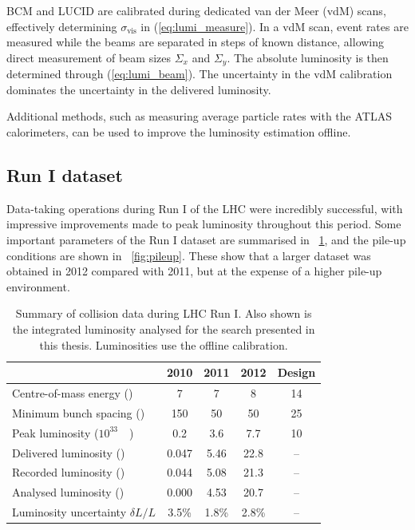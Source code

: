 \ac{BCM} and LUCID are calibrated during dedicated van der Meer (vdM) scans, effectively 
determining $\sigma_{\text{vis}}$ in (\ref{eq:lumi_measure}). In a vdM scan, event rates 
are measured while the beams are separated in steps of known distance, allowing direct 
measurement of beam sizes $\varSigma_x$ and $\varSigma_y$. The absolute luminosity is then 
determined through (\ref{eq:lumi_beam}). The uncertainty in the vdM calibration dominates 
the uncertainty in the delivered luminosity.

Additional methods, such as measuring average particle rates with the ATLAS calorimeters, 
can be used to improve the luminosity estimation offline.



\subsection{Run I dataset}
\label{sec:dataset:dataset}

Data-taking operations during Run I of the LHC were incredibly successful, with impressive 
improvements made to peak luminosity throughout this period. Some important parameters of 
the Run I dataset are summarised in \Table~\ref{tab:dataset}, and the pile-up conditions are shown in \Figure~\ref{fig:pileup}. These show that a larger dataset was obtained in 2012 compared with 2011, but at the expense of a higher pile-up environment.

\begin{table}[h]
	\begin{tabular}{l@{\hskip 0.3in}c@{\hskip 0.3in}c@{\hskip 0.3in}c@{\hskip 0.3in}c}
	& 2010 & 2011 & 2012 & Design \\
	\hline
	Centre-of-mass energy (\TeV)         & 7 & 7 & 8 & 14 \\
	Minimum bunch spacing (\nano\second) & 150 & 50 & 50 & 25 \\
	Peak luminosity (\unit{$10^{33}$}{\lumiunits}) & 0.2 & 3.6 & 7.7 & 10 \\
	Delivered luminosity (\invfb)       & 0.047 & 5.46 & 22.8 & -- \\
	Recorded luminosity (\invfb)        & 0.044 & 5.08 & 21.3 & -- \\
	Analysed luminosity (\invfb)        & 0.000 & 4.53 & 20.7 & -- \\
	Luminosity uncertainty $\delta L/L$ & 3.5\% & 1.8\% & 2.8\% & -- \\
	\end{tabular}
	\caption{Summary of \pp collision data during \ac{LHC} Run I. Also shown is the 
	integrated luminosity analysed for the \HWW search presented in this thesis. 
	Luminosities use the offline calibration.}
	\label{tab:dataset}
\end{table}


